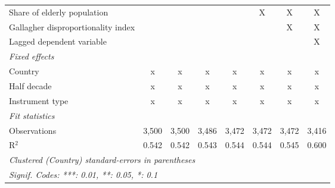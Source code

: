 \begin{tabular}{lccccccc}
   Share of elderly population                                      &                &                &                &                & X              & X              & X\\  
   Gallagher disproportionality index                               &                &                &                &                &                & X              & X\\  
   Lagged dependent variable                                        &                &                &                &                &                &                & X\\  
   \emph{Fixed effects}\\
   Country                                                          & x              & x              & x              & x              & x              & x              & x\\  
   Half decade                                                      & x              & x              & x              & x              & x              & x              & x\\  
   Instrument type                                                  & x              & x              & x              & x              & x              & x              & x\\  
   \midrule \emph{Fit statistics}\\
   Observations                                                     & 3,500          & 3,500          & 3,486          & 3,472          & 3,472          & 3,472          & 3,416\\  
   R$^2$                                                            & 0.542          & 0.542          & 0.543          & 0.544          & 0.544          & 0.545          & 0.600\\  
   \midrule
   \multicolumn{8}{l}{\emph{Clustered (Country) standard-errors in parentheses}}\\
   \multicolumn{8}{l}{\emph{Signif. Codes: ***: 0.01, **: 0.05, *: 0.1}}\\
\end{tabular}
\par\endgroup


